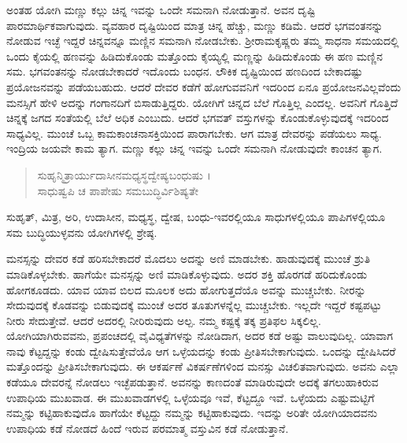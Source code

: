 ಅಂತಹ ಯೋಗಿ ಮಣ್ಣು ಕಲ್ಲು ಚಿನ್ನ ಇವನ್ನು ಒಂದೇ ಸಮನಾಗಿ ನೋಡುತ್ತಾನೆ. ಅವನ ದೃಷ್ಟಿ ಪಾರಮಾರ್ಥಿಕವಾಗುವುದು. ವ್ಯವಹಾರ ದೃಷ್ಟಿಯಿಂದ ಮಾತ್ರ ಚಿನ್ನ ಹೆಚ್ಚು, ಮಣ್ಣು ಕಡಿಮೆ. ಆದರೆ ಭಗವಂತನನ್ನು ನೋಡುವ ಇಚ್ಛೆ ಇದ್ದರೆ ಚಿನ್ನವನ್ನೂ ಮಣ್ಣಿನ ಸಮನಾಗಿ ನೋಡಬೇಕು. ಶ್ರೀರಾಮಕೃಷ್ಣರು ತಮ್ಮ ಸಾಧನಾ ಸಮಯದಲ್ಲಿ ಒಂದು ಕೈಯಲ್ಲಿ ಹಣವನ್ನು ಹಿಡಿದುಕೊಂಡು ಮತ್ತೊಂದು ಕೈಯ್ಯಲ್ಲಿ ಮಣ್ಣನ್ನು ಹಿಡಿದುಕೊಂಡು ಈ ಹಣ ಮಣ್ಣಿನ ಸಮ. ಭಗವಂತನನ್ನು ನೋಡಬೇಕಾದರೆ ಇದೊಂದು ಬಂಧನ. ಲೌಕಿಕ ದೃಷ್ಟಿಯಿಂದ ಹಣದಿಂದ ಬೇಕಾದಷ್ಟು ಪ್ರಯೋಜನವನ್ನು ಪಡೆಯಬಹುದು. ಆದರೆ ದೇವರ ಕಡೆಗೆ ಹೋಗುವವನಿಗೆ ಇದರಿಂದ ಏನೂ ಪ್ರಯೋಜನವಿಲ್ಲವೆಂದು ಮನಸ್ಸಿಗೆ ಹೇಳಿ ಅದನ್ನು ಗಂಗಾನದಿಗೆ ಬಿಸಾಡುತ್ತಿದ್ದರು. ಯೋಗಿಗೆ ಚಿನ್ನದ ಬೆಲೆ ಗೊತ್ತಿಲ್ಲ ಎಂದಲ್ಲ. ಅವನಿಗೆ ಗೊತ್ತಿದೆ ಚಿನ್ನಕ್ಕೆ ಜಗದ ಸಂತೆಯಲ್ಲಿ ಬೆಲೆ ಅಧಿಕ ಎಂಬುದು. ಆದರೆ ಭಗವತ್ ವಸ್ತುಗಳನ್ನು ಕೊಂಡುಕೊಳ್ಳುವುದಕ್ಕೆ ಇದರಿಂದ ಸಾಧ್ಯವಿಲ್ಲ. ಮುಂಚೆ ಒಬ್ಬ ಕಾಮಕಾಂಚನಾಸಕ್ತಿಯಿಂದ ಪಾರಾಗಬೇಕು. ಆಗ ಮಾತ್ರ ದೇವರನ್ನು ಪಡೆಯಲು ಸಾಧ್ಯ. ಇಂದ್ರಿಯ ಜಯವೇ ಕಾಮ ತ್ಯಾಗ. ಮಣ್ಣು ಕಲ್ಲು ಚಿನ್ನ ಇವನ್ನು ಒಂದೇ ಸಮನಾಗಿ ನೋಡುವುದೇ ಕಾಂಚನ ತ್ಯಾಗ.

\begin{verse}
ಸುಹೃನ್ಮಿತ್ರಾರ್ಯುದಾಸೀನಮಧ್ಯಸ್ಥದ್ವೇಷ್ಯಬಂಧುಷು ।\\ಸಾಧುಷ್ವಪಿ ಚ ಪಾಪೇಷು ಸಮಬುದ್ಧಿರ್ವಿಶಿಷ್ಯತೇ 
\end{verse}

ಸುಹೃತ್, ಮಿತ್ರ, ಅರಿ, ಉದಾಸೀನ, ಮಧ್ಯಸ್ಥ, ದ್ವೇಷ, ಬಂಧು-ಇವರಲ್ಲಿಯೂ ಸಾಧುಗಳಲ್ಲಿಯೂ ಪಾಪಿಗಳಲ್ಲಿಯೂ ಸಮ ಬುದ್ಧಿಯುಳ್ಳವನು ಯೋಗಿಗಳಲ್ಲಿ ಶ್ರೇಷ್ಠ.

ಮನಸ್ಸನ್ನು ದೇವರ ಕಡೆ ಹರಿಸಬೇಕಾದರೆ ಮೊದಲು ಅದನ್ನು ಅಣಿ ಮಾಡಬೇಕು. ಹಾಡುವುದಕ್ಕೆ ಮುಂಚೆ ಶ್ರುತಿ ಮಾಡಿಕೊಳ್ಳಬೇಕು. ಹಾಗೆಯೇ ಮನಸ್ಸನ್ನು ಅಣಿ ಮಾಡಿಕೊಳ್ಳುವುದು. ಅದರ ಶಕ್ತಿ ಹೊರಗಡೆ ಹರಿದುಕೊಂಡು ಹೋಗಕೂಡದು. ಯಾವ ಯಾವ ಬಿಲದ ಮೂಲಕ ಅದು ಹೋಗುತ್ತದೆಯೊ ಅವನ್ನು ಮುಚ್ಚಬೇಕು. ನೀರನ್ನು ಸೇದುವುದಕ್ಕೆ ಕೊಡವನ್ನು ಬಿಡುವುದಕ್ಕೆ ಮುಂಚೆ ಅದರ ತೂತುಗಳನ್ನೆಲ್ಲ ಮುಚ್ಚಬೇಕು. ಇಲ್ಲದೇ ಇದ್ದರೆ ಕಷ್ಟಪಟ್ಟು ನೀರು ಸೇದುತ್ತೇವೆ. ಆದರೆ ಅದರಲ್ಲಿ ನೀರಿರುವುದು ಅಲ್ಪ. ನಮ್ಮ ಕಷ್ಟಕ್ಕೆ ತಕ್ಕ ಪ್ರತಿಫಲ ಸಿಕ್ಕಲಿಲ್ಲ. ಯೋಗಿಯಾಗಿರುವವನು, ಪ್ರಪಂಚದಲ್ಲಿ ವೈವಿಧ್ಯತೆಗಳನ್ನು ನೋಡಿದಾಗ, ಅದರ ಕಡೆ ಅಷ್ಟು ವಾಲುವುದಿಲ್ಲ. ಯಾವಾಗ ನಾವು ಕೆಟ್ಟದ್ದನ್ನು ಕಂಡು ದ್ವೇಷಿಸುತ್ತೇವೆಯೊ ಆಗ ಒಳ್ಳೆಯದನ್ನು ಕಂಡು ಪ್ರೀತಿಸಬೇಕಾಗುವುದು. ಒಂದನ್ನು ದ್ವೇಷಿಸಿದರೆ ಮತ್ತೊಂದನ್ನು ಪ್ರೀತಿಸಬೇಕಾಗುವುದು. ಈ ಆಕರ್ಷಣೆ ವಿಕರ್ಷಣೆಗಳಿಂದ ಮನಸ್ಸು ವಿಚಲಿತವಾಗುವುದು. ಅವನು ಎಲ್ಲಾ ಕಡೆಯೂ ದೇವರನ್ನೆ ನೋಡಲು ಇಚ್ಛೆಪಡುತ್ತಾನೆ. ಅವನನ್ನು ಕಾಣದಂತೆ ಮಾಡಿರುವುದೇ ಅದಕ್ಕೆ ತಗಲುಹಾಕಿರುವ ಉಪಾಧಿಯ ಮುಖವಾಡ. ಈ ಮುಖವಾಡಗಳಲ್ಲಿ ಒಳ್ಳೆಯವೂ ಇವೆ, ಕೆಟ್ಟದ್ದೂ ಇವೆ. ಒಳ್ಳೆಯದು ಎಷ್ಟುಮಟ್ಟಿಗೆ ನಮ್ಮನ್ನು ಕಟ್ಟಿಹಾಕುವುದೊ ಹಾಗೆಯೇ ಕೆಟ್ಟದ್ದು ನಮ್ಮನ್ನು ಕಟ್ಟಿಹಾಕುವುದು. ಇದನ್ನು ಅರಿತೇ ಯೋಗಿಯಾದವನು ಉಪಾಧಿಯ ಕಡೆ ನೋಡದೆ ಹಿಂದೆ ಇರುವ ಪರಮಾತ್ಮ ವಸ್ತುವಿನ ಕಡೆ ನೋಡುತ್ತಾನೆ.

